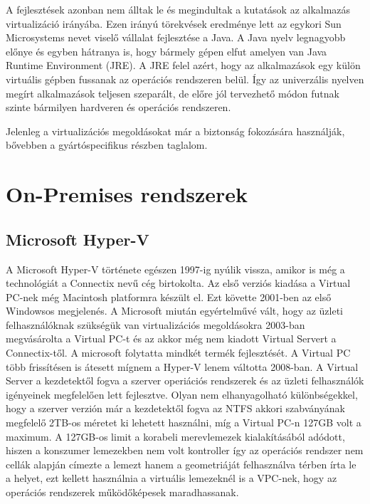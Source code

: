 \documentclass[12pt,oneside,justify]{book}
\begin{document}
A fejlesztések azonban nem álltak le és megindultak a kutatások az alkalmazás virtualizáció irányába. 
Ezen irányú törekvések eredménye lett az egykori Sun Microsystems nevet viselő vállalat fejlesztése a Java. 
A Java nyelv legnagyobb előnye és egyben hátranya is, hogy bármely gépen elfut amelyen van Java Runtime Environment (JRE). 
A JRE felel azért, hogy az alkalmazások egy külön virtuális gépben fussanak az operációs rendszeren belül. 
Így az univerzális nyelven megírt alkalmazások teljesen szeparált, de előre jól tervezhető módon futnak szinte bármilyen hardveren és operációs rendszeren.

Jelenleg a virtualizációs megoldásokat már a biztonság fokozására használják, bővebben a gyártóspecifikus részben taglalom.

\section{On-Premises rendszerek}

\subsection{Microsoft Hyper-V\texttrademark}

A Microsoft Hyper-V története egészen 1997-ig nyúlik vissza, amikor is még a technológiát a Connectix nevű cég birtokolta. 
Az első verziós kiadása a Virtual PC-nek még Macintosh platformra készült el. 
Ezt követte 2001-ben az első Windowsos megjelenés. 
A Microsoft miután egyértelművé vált, hogy az üzleti felhasználóknak szükségük van virtualizációs megoldásokra 2003-ban megvásárolta a Virtual PC-t és az akkor még nem kiadott Virtual Servert a Connectix-től. 
A microsoft folytatta mindkét termék fejlesztését. A Virtual PC több frissítésen is átesett mígnem a Hyper-V lenem váltotta 2008-ban. 
A Virtual Server a kezdetektől fogva a szerver operiációs rendszerek és az üzleti felhasználók igényeinek megfelelően lett fejlesztve. 
Olyan nem elhanyagolható különbségekkel, hogy a szerver verzión már a kezdetektől fogva az NTFS akkori szabványának megfelelő 2TB-os méretet ki lehetett használni, míg a Virtual PC-n 127GB volt a maximum. 
A 127GB-os limit a korabeli merevlemezek kialakításából adódott, hiszen a konszumer lemezekben nem volt kontroller így az operációs rendszer nem cellák alapján címezte a lemezt hanem a geometriáját felhasználva térben írta le a helyet, ezt kellett használnia a virtuális lemezeknél is a VPC-nek, hogy az operációs rendszerek működőképesek maradhassanak.
\end{document}
